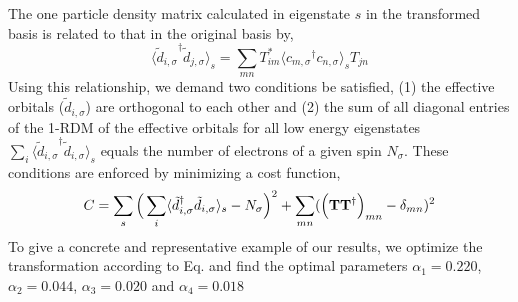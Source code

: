 The one particle density matrix calculated in eigenstate $s$ in the transformed basis is related to that in the original basis by,
\begin{equation}
	\langle {\tilde{d}_{i,\sigma}}^{\dagger} \tilde{d}_{j,\sigma} \rangle_{s} = \sum_{mn} T^{*}_{im} \langle {c_{m,\sigma}}^{\dagger} c_{n,\sigma} \rangle_{s} T_{jn}
\end{equation}
Using this relationship, we demand two conditions be satisfied, (1) the effective orbitals ($\tilde{d}_{i,\sigma}$) 
are orthogonal to each other and (2) the sum of all diagonal entries of the 1-RDM of the effective orbitals for all low energy eigenstates 
$\sum_{i} \langle {\tilde{d}_{i,\sigma}}^{\dagger} \tilde{d}_{i,\sigma} \rangle_{s}$ 
equals the number of electrons of a given spin $N_{\sigma}$. 
These conditions are enforced by minimizing a cost function,
\begin{equation}
C = \sum_{s} \Big( \sum_{i} \langle \tilde{d}_{i,\sigma}^{\dagger} \tilde{d}_{i,\sigma} \rangle_{s} - N_{\sigma} \Big)^{2} + \sum_{mn} ( \Big({\bf T} {\bf T}^{\dagger}\Big)_{mn} -\delta_{mn})^{2}
\label{eq:C}
\end{equation} 
To give a concrete and representative example of our results, we optimize the transformation 
according to Eq. and find the optimal parameters $\alpha_1=0.220$, $\alpha_2=0.044$, $\alpha_3=0.020$ 
and $\alpha_4=0.018$ 
